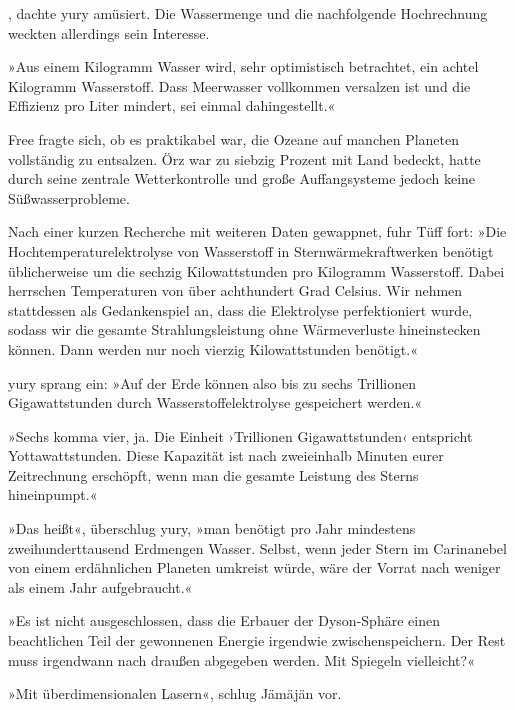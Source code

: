 , dachte yury amüsiert.  Die Wassermenge und die nachfolgende Hochrechnung weckten allerdings sein Interesse.

»Aus einem Kilogramm Wasser wird, sehr optimistisch betrachtet, ein achtel Kilogramm Wasserstoff. Dass Meerwasser vollkommen versalzen ist und die Effizienz pro Liter mindert, sei einmal dahingestellt.«

Free fragte sich, ob es praktikabel war, die Ozeane auf manchen Planeten vollständig zu entsalzen. Örz war zu siebzig Prozent mit Land bedeckt, hatte durch seine zentrale Wetterkontrolle und große Auffangsysteme jedoch keine Süßwasserprobleme.

Nach einer kurzen Recherche mit weiteren Daten gewappnet, fuhr Tüff fort: »Die Hochtemperaturelektrolyse von Wasserstoff in Sternwärmekraftwerken benötigt üblicherweise um die sechzig Kilowattstunden pro Kilogramm Wasserstoff. Dabei herrschen Temperaturen von über achthundert Grad Celsius. Wir nehmen stattdessen als Gedankenspiel an, dass die Elektrolyse perfektioniert wurde, sodass wir die gesamte Strahlungsleistung ohne Wärmeverluste hineinstecken können. Dann werden nur noch vierzig Kilowattstunden benötigt.«

yury sprang ein: »Auf der Erde können also bis zu sechs Trillionen Gigawattstunden durch Wasserstoffelektrolyse gespeichert werden.«

»Sechs komma vier, ja. Die Einheit ›Trillionen Gigawattstunden‹ entspricht Yottawattstunden. Diese Kapazität ist nach zweieinhalb Minuten eurer Zeitrechnung erschöpft, wenn man die gesamte Leistung des Sterns hineinpumpt.«

»Das heißt«, überschlug yury, »man benötigt pro Jahr mindestens zweihunderttausend Erdmengen Wasser. Selbst, wenn jeder Stern im Carinanebel von einem erdähnlichen Planeten umkreist würde, wäre der Vorrat nach weniger als einem Jahr aufgebraucht.«

»Es ist nicht ausgeschlossen, dass die Erbauer der Dyson-Sphäre einen beachtlichen Teil der gewonnenen Energie irgendwie zwischenspeichern. Der Rest muss irgendwann nach draußen abgegeben werden. Mit Spiegeln vielleicht?«

»Mit überdimensionalen Lasern«, schlug Jämäjän vor.


